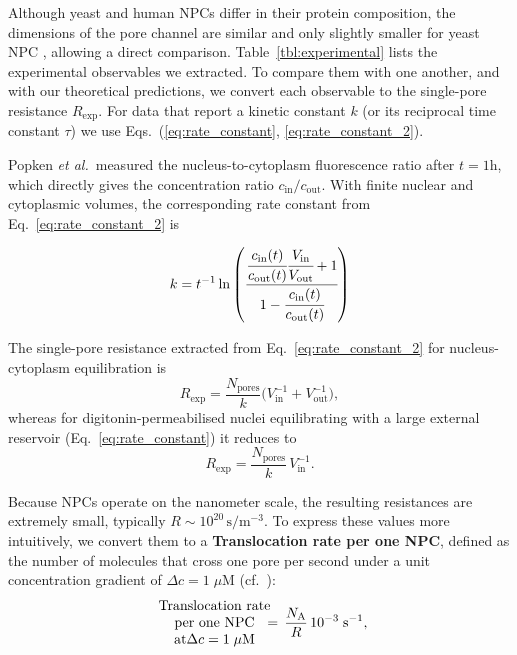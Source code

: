 \documentclass[10pt, a4paper]{article}
\begin{document}
\begin{multicols}{2}
Although yeast and human NPCs differ in their protein composition, the dimensions of the pore channel are similar and only slightly smaller for yeast NPC \cite{Yang1998}, allowing a direct comparison.  
Table~\ref{tbl:experimental} lists the experimental observables we extracted. 
To compare them with one another, and with our theoretical predictions, we convert each observable to the single-pore resistance $R_{\text{exp}}$.  
For data that report a kinetic constant $k$ (or its reciprocal time constant $\tau$) we use Eqs.~(\ref{eq:rate_constant}, \ref{eq:rate_constant_2}).

Popken \textit{et al.}\,\cite{Popken2015} measured the
nucleus-to-cytoplasm fluorescence ratio after $t =  1\text{h}$, which directly gives the concentration ratio
$c_{\text{in}}/c_{\text{out}}$.  
With finite nuclear and cytoplasmic volumes, the corresponding rate
constant from Eq.~\ref{eq:rate_constant_2} is

\begin{equation}
    k = t^{-1}\ln\left(
        \cfrac{\cfrac{c_{\text{in}}(t)}{c_{\text{out}}(t)} \cfrac{V_{\text{in}}}{V_{\text{out}}} +1}
             {1 - \cfrac{c_{\text{in}}(t)}{c_{\text{out}}(t)}}
        \right)
\end{equation}

The single-pore resistance extracted from Eq.~\ref{eq:rate_constant_2}
for nucleus-cytoplasm equilibration is
\begin{equation*}
  R_{\text{exp}}
  = \frac{N_{\text{pores}}}{k}
    \bigl(V_{\text{in}}^{-1}+V_{\text{out}}^{-1}\bigr),
\end{equation*}
whereas for digitonin-permeabilised nuclei equilibrating with a large
external reservoir (Eq.~\ref{eq:rate_constant}) it reduces to
\begin{equation*}
  R_{\text{exp}}
  = \frac{N_{\text{pores}}}{k}\,V_{\text{in}}^{-1}.
\end{equation*}

Because NPCs operate on the nanometer scale, the resulting resistances are extremely small, typically
$R\sim10^{20}\,\text{s}/\text{m}^{-3}$.  
To express these values more intuitively, we convert them to a
\textbf{Translocation rate per one NPC}, defined as the number of molecules that cross one pore per second under a unit concentration gradient of $\Delta c = 1\;\mu\text{M}$ (cf.~\cite{Ribbeck2001}):
\begin{equation}
    \begin{array}{c}
        \text{Translocation rate} \\
        \text{per one NPC}\\
        \text{at} \Delta c = 1\;\mu\text{M}
    \end{array}
    \hspace{-1em}= \,\frac{N_{\mathrm{A}}}{R}\,10^{-3}\;\text{s}^{-1},
\end{equation}


\end{multicols}
\end{document}
